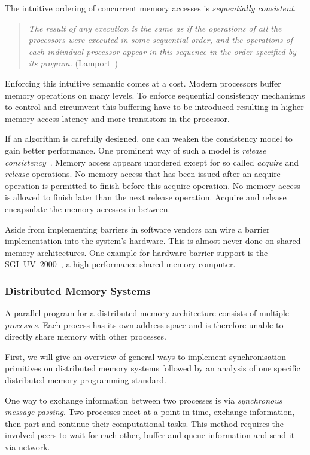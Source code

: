 \documentclass[a4paper, 10pt]{article}
\begin{document}
The intuitive ordering of concurrent memory accesses is \emph{sequentially consistent}.
\begin{quote}
	\textit{The result of any execution is the same as if the operations of all the processors were executed in some sequential order, and the operations of each individual processor appear in this sequence in the order specified by its program.} (Lamport~\cite{sequentialconsistency})
\end{quote}

Enforcing this intuitive semantic comes at a cost. Modern processors buffer memory operations on many levels. To enforce sequential consistency mechanisms to control and circumvent this buffering have to be introduced resulting in higher memory access latency and more transistors in the processor.

If an algorithm is carefully designed, one can weaken the consistency model to gain better performance. One prominent way of such a model is \textit{release consistency}~\cite{gha90}. Memory access appears unordered except for so called \emph{acquire} and \emph{release} operations. No memory access that has been issued after an acquire operation is permitted to finish before this acquire operation. No memory access is allowed to finish later than the next release operation. Acquire and release encapsulate the memory accesses in between.

Aside from implementing barriers in software vendors can wire a barrier implementation into the system's hardware. This is almost never done on shared memory architectures. One example for hardware barrier support is the SGI~UV~2000~\cite{sgiuv2000}, a high-performance shared memory computer.

\subsubsection{Distributed Memory Systems}
\label{sssec:background-means-distributed}
A parallel program for a distributed memory architecture consists of multiple \emph{processes}. Each process has its own address space and is therefore unable to directly share memory with other processes.

First, we will give an overview of general ways to implement synchronisation primitives on distributed memory systems followed by an analysis of one specific distributed memory programming standard.

One way to exchange information between two processes is via \emph{synchronous message passing}. Two processes meet at a point in time, exchange information, then part and continue their computational tasks. This method requires the involved peers to wait for each other, buffer and queue information and send it via network.
\end{document}
